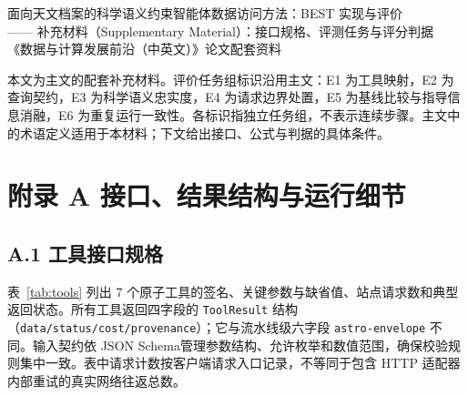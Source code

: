 \documentclass{dcfp}
\renewcommand\normalsize{\fontsize{9.5bp}{13.5bp}\selectfont}
\begin{document}
\DisableWordPageBorder

\begin{center}
{\heiti\fontsize{14bp}{18bp}\selectfont 面向天文档案的科学语义约束智能体数据访问方法：BEST 实现与评价}\\[6bp]
{\heiti\fontsize{12bp}{16bp}\selectfont —— 补充材料（Supplementary Material）：接口规格、评测任务与评分判据}\\[8bp]
{\kaishu\fontsize{10.5bp}{15bp}\selectfont 《数据与计算发展前沿（中英文）》论文配套资料}
\end{center}
\vspace{2bp}

\normalsize
本文为主文的配套补充材料。评价任务组标识沿用主文：E1 为工具映射，E2 为查询契约，E3 为科学语义忠实度，E4 为请求边界处置，E5 为基线比较与指导信息消融，E6 为重复运行一致性。各标识指独立任务组，不表示连续步骤。主文中的术语定义适用于本材料；下文给出接口、公式与判据的具体条件。

\section*{附录 A  接口、结果结构与运行细节}

\subsection*{A.1  工具接口规格}

表~\ref{tab:tools} 列出 7 个原子工具的签名、关键参数与缺省值、站点请求数和典型返回状态。所有工具返回四字段的 \texttt{ToolResult} 结构（\texttt{data/status/cost/provenance}）；它与流水线级六字段 \texttt{astro-envelope} 不同。输入契约依 JSON Schema\citep{ref14}管理参数结构、允许枚举和数值范围，确保校验规则集中一致。表中请求计数按客户端请求入口记录，不等同于包含 HTTP 适配器内部重试的真实网络往返总数。
\end{document}
